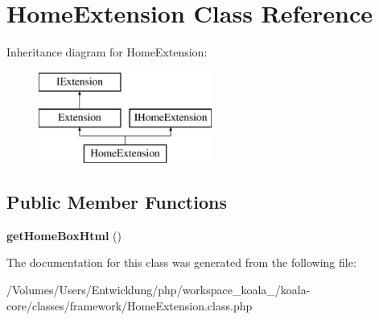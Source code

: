 \hypertarget{class_home_extension}{
\section{HomeExtension Class Reference}
\label{class_home_extension}
}
Inheritance diagram for HomeExtension:\begin{figure}[H]
\begin{center}
\leavevmode
\includegraphics[height=3.000000cm]{class_home_extension}
\end{center}
\end{figure}
\subsection*{Public Member Functions}
\begin{DoxyCompactItemize}
\item 
\hypertarget{class_home_extension_aa12fa623c3b4ce4f02993570d7c3a48e}{
{\bfseries getHomeBoxHtml} ()}
\label{class_home_extension_aa12fa623c3b4ce4f02993570d7c3a48e}

\end{DoxyCompactItemize}


The documentation for this class was generated from the following file:\begin{DoxyCompactItemize}
\item 
/Volumes/Users/Entwicklung/php/workspace\_\-koala\_/koala-\/core/classes/framework/HomeExtension.class.php\end{DoxyCompactItemize}
